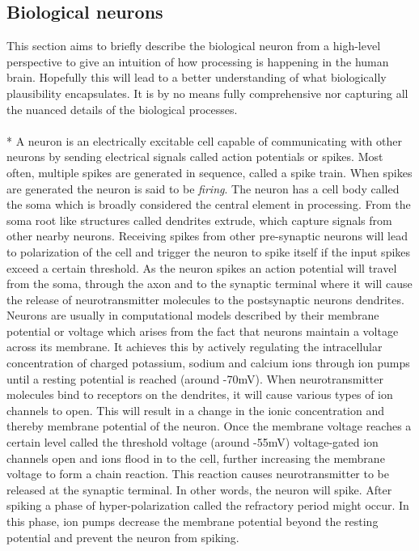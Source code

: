\documentclass[a4paper,11pt]{article}
\begin{document}
\subsection{Biological neurons} \label{sec:neurons}
This section aims to briefly describe the biological neuron from a high-level perspective to give an intuition of how processing is happening in the human brain. Hopefully this will lead to a better understanding of what biologically plausibility encapsulates. It is by no means fully comprehensive nor capturing all the nuanced details of the biological processes. \\
\\*
A neuron is an electrically excitable cell capable of communicating with other neurons by sending electrical signals called action potentials or spikes. Most often, multiple spikes are generated in sequence, called a spike train. When spikes are generated the neuron is said to be \textit{firing}. The neuron has a cell body called the soma which is broadly considered the central element in processing. From the soma root like structures called dendrites extrude, which capture signals from other nearby neurons. Receiving spikes from other pre-synaptic neurons will lead to polarization of the cell and trigger the neuron to spike itself if the input spikes exceed a certain threshold. As the neuron spikes an action potential will travel from the soma, through the axon and to the synaptic terminal where it will cause the release of neurotransmitter molecules to the postsynaptic neurons dendrites. Neurons are usually in computational models described by their membrane potential or voltage which arises from the fact that neurons maintain a voltage across its membrane. It achieves this by actively regulating the intracellular concentration of charged potassium, sodium and calcium ions through ion pumps until a resting potential is reached (around -70mV). When neurotransmitter molecules bind to receptors on the dendrites, it will cause various types of ion channels to open. This will result in a change in the ionic concentration and thereby membrane potential of the neuron. Once the membrane voltage reaches a certain level called the threshold voltage (around -55mV) voltage-gated ion channels open and ions flood in to the cell, further increasing the membrane voltage to form a chain reaction. This reaction causes neurotransmitter to be released at the synaptic terminal. In other words, the neuron will spike. After spiking a phase of hyper-polarization called the refractory period might occur. In this phase, ion pumps decrease the membrane potential beyond the resting potential and prevent the neuron from spiking. \\
\end{document}
